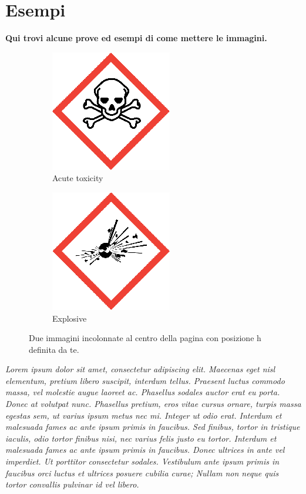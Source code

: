 \newpage
\section*{Esempi}
\textbf{Qui trovi alcune prove ed esempi di come mettere le immagini.}

\begin{figure}[h]
    \centering
    \begin{subfigure}[]{0.5\linewidth}
    \centering
    \includegraphics[scale=0.2]{img/pittogrammi/Acute toxicity.png}
    \caption{Acute toxicity}
    \end{subfigure}
    \begin{subfigure}[]{0.5\linewidth}
    \centering
    \includegraphics[scale=0.2]{img/pittogrammi/Explosive.png}
    \caption{Explosive}
    \end{subfigure}
    \caption{Due immagini incolonnate al centro della pagina con posizione h definita da te.}
    \label{fig:1}
\end{figure}

\textit{Lorem ipsum dolor sit amet, consectetur adipiscing elit. Maecenas eget nisl elementum, pretium libero suscipit, interdum tellus. Praesent luctus commodo massa, vel molestie augue laoreet ac. Phasellus sodales auctor erat eu porta. Donec at volutpat nunc. Phasellus pretium, eros vitae cursus ornare, turpis massa egestas sem, ut varius ipsum metus nec mi. Integer ut odio erat. Interdum et malesuada fames ac ante ipsum primis in faucibus. Sed finibus, tortor in tristique iaculis, odio tortor finibus nisi, nec varius felis justo eu tortor. Interdum et malesuada fames ac ante ipsum primis in faucibus. Donec ultrices in ante vel imperdiet. Ut porttitor consectetur sodales. Vestibulum ante ipsum primis in faucibus orci luctus et ultrices posuere cubilia curae; Nullam non neque quis tortor convallis pulvinar id vel libero.}

